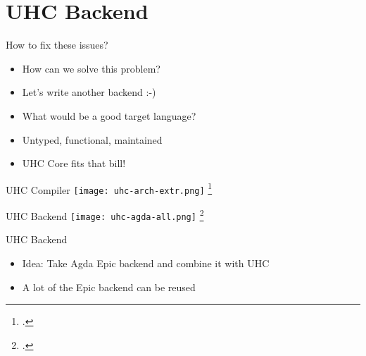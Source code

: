 \section{UHC Backend}

\begin{frame}{How to fix these issues?}
\begin{itemize}
\item How can we solve this problem?
\pause \item Let's write another backend :-)
\pause \item What would be a good target language?
\pause \item Untyped, functional, maintained
\pause \item UHC Core fits that bill!
\end{itemize}
\end{frame}

\begin{frame}[fragile]{UHC Compiler}
\hspace{3cm}
\texttt{[image: uhc-arch-extr.png]}
\footcite{dijkstra2009architecture}
\end{frame}

\begin{frame}[fragile]{UHC Backend}
\texttt{[image: uhc-agda-all.png]}
\footcite{dijkstra2009architecture}
\end{frame}



\begin{frame}{UHC Backend}
\begin{itemize}
\item Idea: Take Agda Epic backend and combine it with UHC
\item A lot of the Epic backend can be reused
\end{itemize}
\end{frame}


